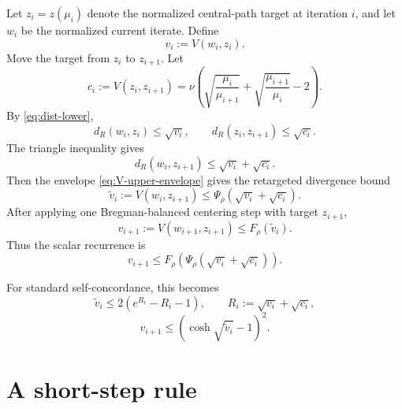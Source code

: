 \documentclass[11pt]{article}
\newcommand{\distR}{d_R}
\begin{document}
Let $z_i=z(\mu_i)$ denote the normalized central-path target at iteration $i$, and let $w_i$ be the normalized current iterate. Define
\begin{equation}
  v_i:=V(w_i,z_i).
\end{equation}
Move the target from $z_i$ to $z_{i+1}$.  Let
\begin{equation}
  c_i:=V(z_i,z_{i+1})
  =\nu\left(
  \sqrt{\frac{\mu_i}{\mu_{i+1}}}
  +
  \sqrt{\frac{\mu_{i+1}}{\mu_i}}
  -2
  \right).                                      \label{eq:c-i}
\end{equation}
By \eqref{eq:dist-lower},
\[
  \distR(w_i,z_i)\le\sqrt{v_i},
  \qquad
  \distR(z_i,z_{i+1})\le\sqrt{c_i}.
\]
The triangle inequality gives
\begin{equation}
  \distR(w_i,z_{i+1})\le \sqrt{v_i}+\sqrt{c_i}.       \label{eq:triangle-target}
\end{equation}
Then the envelope \eqref{eq:V-upper-envelope} gives the retargeted divergence bound
\begin{equation}
  \widetilde v_i:=V(w_i,z_{i+1})
  \le
  \Psi_\rho\left(\sqrt{v_i}+\sqrt{c_i}\right).       \label{eq:vtilde-general}
\end{equation}
After applying one Bregman-balanced centering step with target $z_{i+1}$,
\begin{equation}
  v_{i+1}:=V(w_{i+1},z_{i+1})
  \le
  F_\rho(\widetilde v_i).                            \label{eq:after-center}
\end{equation}
Thus the scalar recurrence is
\begin{equation}
  \boxed{
  v_{i+1}
  \le
  F_\rho\left(
  \Psi_\rho\left(\sqrt{v_i}+\sqrt{c_i}\right)
  \right).
  }                                                  \label{eq:scalar-recurrence-general}
\end{equation}

For standard self-concordance, this becomes
\begin{equation}
  \widetilde v_i\le 2(e^{R_i}-R_i-1),
  \qquad
  R_i:=\sqrt{v_i}+\sqrt{c_i},                         \label{eq:vtilde-sc}
\end{equation}
\begin{equation}
  v_{i+1}\le (\cosh\sqrt{\widetilde v_i}-1)^2.        \label{eq:recurrence-sc}
\end{equation}

\section{A short-step rule}
\end{document}
